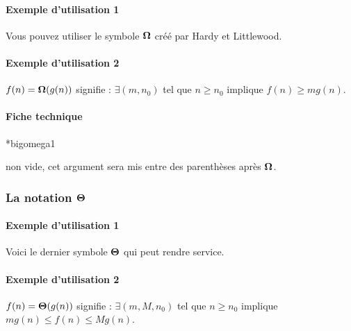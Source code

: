 \documentclass[12pt,a4paper]{article}
\makeatletter
\theoremstyle{definition}
\newcommand\IDmacro{\@ifstar{\@IDmacro@star}{\@IDmacro@no@star}}
\newcommand\@IDmacro@no@star[3]{%
    \texttt{%
    	\textbackslash#1 <macro>%
    	\IfStrEq{#2}{0}{}{%
    		\,\,[#2 Option%
				\IfStrEq{#2}{1}{}{s}]%
			}%
	    \IfStrEq{#3}{}{}{%
	    		\,\,(#3 Argument%
				\IfStrEq{#3}{1}{}{s})%
			}
	   	}
    \immediate\write\tempfile{macro,#1,#2,#3}%
}
\newcommand\@IDmacro@star[2]{%
    \@IDmacro@no@star{#1}{0}{#2}%
}
\newcommand\@IDoptarg{\@ifstar{\@IDoptarg@star}{\@IDoptarg@no@star}}
\newcommand\@IDoptarg@star[2]{%
	\vspace{0.5em}
	\textbf{---} \texttt{#1%
		\IfStrEq{#2}{}{:}{\,#2:}%
	}%
}
\newcommand\@IDoptarg@no@star[2]{%
	\IfStrEq{#2}{}{%
		\@IDoptarg@star{#1}{}%
	}{%
		\@IDoptarg@star{#1}{#2}%
	}%
}
\newcommand\IDarg[1]{%
	\@IDoptarg{Argument}{#1}%
}
\makeatother
\begin{document}
\paragraph{Exemple d'utilisation 1}

\begin{tcblisting}{}
Vous pouvez utiliser le symbole $\bigomega{}$ créé par Hardy et Littlewood.
\end{tcblisting}


\paragraph{Exemple d'utilisation 2}

\begin{tcblisting}{}
$f(n) = \bigomega{g(n)}$ signifie :
$\exists (m, n_0)$ tel que $n \geqslant n_0$ implique $f(n) \geqslant m g(n)$.
\end{tcblisting}


\paragraph{Fiche technique}

\IDmacro*{bigomega}{1}

\IDarg{} non vide, cet argument sera mis entre des parenthèses après $\bigomega{}$.



\subsubsection{\texorpdfstring{La notation $\bigtheta{}$}%
                               {La notation "grand Theta"}}

\paragraph{Exemple d'utilisation 1}

\begin{tcblisting}{}
Voici le dernier symbole $\bigtheta{}$ qui peut rendre service.
\end{tcblisting}


\paragraph{Exemple d'utilisation 2}

\begin{tcblisting}{}
$f(n) = \bigtheta{g(n)}$ signifie : $\exists (m, M, n_0)$ tel que $n \geqslant n_0$
implique $m g(n) \leqslant f(n) \leqslant M g(n)$.
\end{tcblisting}
\end{document}
